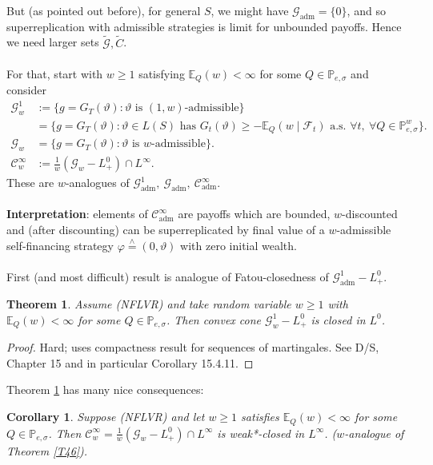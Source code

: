 \documentclass[12pt,a4paper, twoside]{article}
\newtheorem{thm}{Theorem}[section]
\newtheorem{cor}{Corollary}[section]
\theoremstyle{definition}
\newcommand{\EE}{\mathbb{E}} %
\newcommand{\PP}{\mathbb{P}} %
\newcommand{\teq}{\overset{\wedge}{=}}
\begin{document}
But (as pointed out before), for general $S$, we might have $\mathcal{G}_\text{adm}= \{0\}$, and so superreplication with admissible strategies is limit for unbounded payoffs. Hence we need larger sets $\widetilde{\mathcal{G}}, \widetilde{C}$. \\
\\
For that, start with $w \geq 1$ satisfying $\EE_Q(w) < \infty$ for some $Q \in \PP_{e, \sigma}$ and consider 
\begin{align*}
\mathcal{G}_w^1 &:= \{ g = G_T( \vartheta) : \vartheta \text{ is $(1,w)$-admissible}\} \\
&= \{ g = G_T( \vartheta) : \vartheta \in L(S) \text{ has } G_t( \vartheta) \geq - \EE_Q(w \mid \mathcal{F}_t) \text{ a.s. } \forall t, \ \forall Q \in \PP_{e, \sigma}^w\}.  \\
\mathcal{G}_w &= \{ g = G_T( \vartheta) : \vartheta \text{ is $w$-admissible}\}. \\
\mathcal{C}_w^\infty &:= \frac{1}{w}( \mathcal{G}_w-L_+^0) \cap L^\infty. 
\end{align*}
These are $w$-analogues of $\mathcal{G}_\text{adm}^1, \ \mathcal{G}_\text{adm}, \ \mathcal{C}_\text{adm}^\infty$. 
\\\\
\textbf{Interpretation}: elements of $\mathcal{C}_\text{adm}^\infty$ are payoffs which are bounded, $w$-discounted and (after discounting) can be superreplicated by final value of a $w$-admissible self-financing strategy $\varphi \teq (0, \vartheta)$ with zero initial wealth. 
\\\\
First (and most difficult) result is analogue of Fatou-closedness of $\mathcal{G}_\text{adm}^1-L_+^0$. 
\begin{thm} \label{T82} Assume (NFLVR) and take random variable $w \geq 1$ with $\EE_Q(w) < \infty$ for some $Q \in \PP_{e, \sigma}$. Then convex cone $\mathcal{G}_w^1-L_+^0$ is closed in $L^0$. 
\end{thm}
\begin{proof}
Hard; uses compactness result for sequences of martingales. See D/S, Chapter 15 and in particular Corollary 15.4.11.
\end{proof}
\newpage
Theorem \ref{T82} has many nice consequences:
\begin{cor} \label{C83} Suppose (NFLVR) and let $w \geq 1$ satisfies $\EE_Q(w) < \infty$ for some $Q \in \PP_{e,  \sigma}$. Then $\mathcal{C}_w^\infty = \frac{1}{w}( \mathcal{G}_w-L_+^0) \cap L^\infty$ is weak*-closed in $L^\infty$. ($w$-analogue of Theorem \ref{T46}). 
\end{cor}
\end{document}
